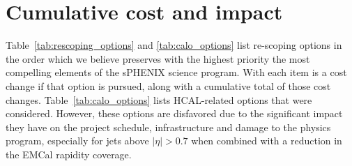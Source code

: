 
\section{Cumulative cost and impact}
\label{sec:cumul-cost-impact}

Table~\ref{tab:rescoping_options} and \ref{tab:calo_options} list re-scoping options in the order which we
believe preserves with the highest priority the most compelling
elements of the sPHENIX science program.  With each item is a cost
change if that option is pursued, along with a cumulative total of
those cost changes. Table~\ref{tab:calo_options} lists HCAL-related options that were considered. 
However, these options are disfavored due to the significant 
impact they have on the project schedule, infrastructure and damage to the 
physics program, especially for jets above $|\eta| > 0.7$ when combined with a reduction in the EMCal rapidity coverage.

